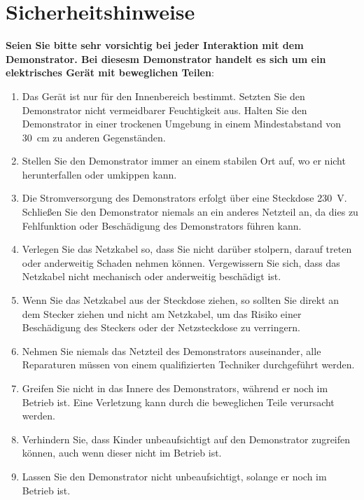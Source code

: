 %
%

\chapter{Sicherheitshinweise}


\textbf{Seien Sie bitte sehr vorsichtig bei jeder Interaktion mit dem Demonstrator. Bei diesesm Demonstrator handelt es sich um ein elektrisches Gerät mit beweglichen Teilen}:


	\begin{enumerate} \item Das Gerät ist nur für den Innenbereich bestimmt. Setzten Sie den Demonstrator nicht vermeidbarer Feuchtigkeit aus. Halten Sie den Demonstrator in einer trockenen Umgebung in einem Mindestabstand von 30\ cm zu anderen Gegenständen.
	
				\item Stellen Sie den Demonstrator immer an einem stabilen Ort auf, wo er nicht herunterfallen oder umkippen kann.	
			
			 	\item Die Stromversorgung des Demonstrators erfolgt über eine Steckdose 230\ V. Schließen Sie den Demonstrator niemals an ein anderes Netzteil an, da dies zu Fehlfunktion oder Beschädigung des Demonstrators führen kann. 
				
				\item Verlegen Sie das Netzkabel so, dass Sie nicht darüber stolpern, darauf treten oder anderweitig Schaden nehmen können. Vergewissern Sie sich, dass das Netzkabel nicht mechanisch oder anderweitig beschädigt ist.
				 
				\item Wenn Sie das Netzkabel aus der Steckdose ziehen, so sollten Sie direkt an dem Stecker ziehen und nicht am Netzkabel, um das Risiko einer Beschädigung des Steckers oder der Netzsteckdose zu verringern.
					
				\item Nehmen Sie niemals das Netzteil des Demonstrators auseinander, alle Reparaturen müssen von einem qualifizierten Techniker durchgeführt werden.
				
				\item Greifen Sie nicht in das Innere des Demonstrators, während er noch im Betrieb ist. Eine Verletzung kann durch die beweglichen Teile verursacht werden.
				
				\item Verhindern Sie, dass Kinder unbeaufsichtigt auf den Demonstrator zugreifen können, auch wenn dieser nicht im Betrieb ist. 
				
				\item Lassen Sie den Demonstrator nicht unbeaufsichtigt, solange er noch im Betrieb ist.
				
				
\end{enumerate}
